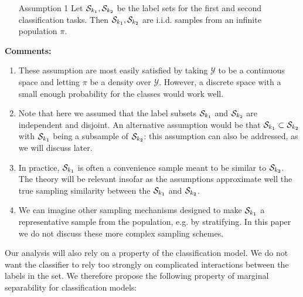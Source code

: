\documentclass[12pt]{article}
\begin{document}
\begin{itemize}
\item[Assumption 1] Let $\mathcal{S}_{k_1}, \mathcal{S}_{k_2}$ be the label sets
for the first and second classification tasks. Then $\mathcal{S}_{k_1}, 
\mathcal{S}_{k_2}$ are i.i.d. samples from an infinite population $\pi$.
\end{itemize}


\textbf{Comments:}
\begin{enumerate}
\item These assumption are most easily satisfied by taking $\mathcal{Y}$ 
to be a continuous space and letting $\pi$ be a density over $\mathcal{Y}$. However, a discrete space with a small enough 
probability for the classes would work well. 
\item Note that here we assumed that the label subsets $\mathcal{S}_{k_1}$ and
$\mathcal{S}_{k_2}$ are independent and disjoint. An alternative
assumption would be that $\mathcal{S}_{k_1} \subset
\mathcal{S}_{k_2}$ with $\mathcal{S}_{k_1}$ being a subsample of
$\mathcal{S}_{k_2}$: this assumption can also be addressed, as we will
discuss later.
\item 
In practice, $\mathcal{S}_{k_1}$ is often a convenience sample meant to be
similar to $\mathcal{S}_{k_2}$. The theory will be relevant insofar as the
assumptions approximate well the true sampling similarity between the
$\mathcal{S}_{k_1}$ and $\mathcal{S}_{k_2}$.
\item We can imagine other sampling mechanisms designed to make $\mathcal{S}_{k_1}$ a representative sample from the population, e.g. by stratifying. In this paper we do not discuss these more complex sampling schemes. 
\end{enumerate}


Our analysis will also rely on a property of the classification
model. We do not want the classifier to rely too strongly on
complicated interactions between the labels in the set. We therefore
propose the following property of marginal separability for
classification models:
\end{document}
